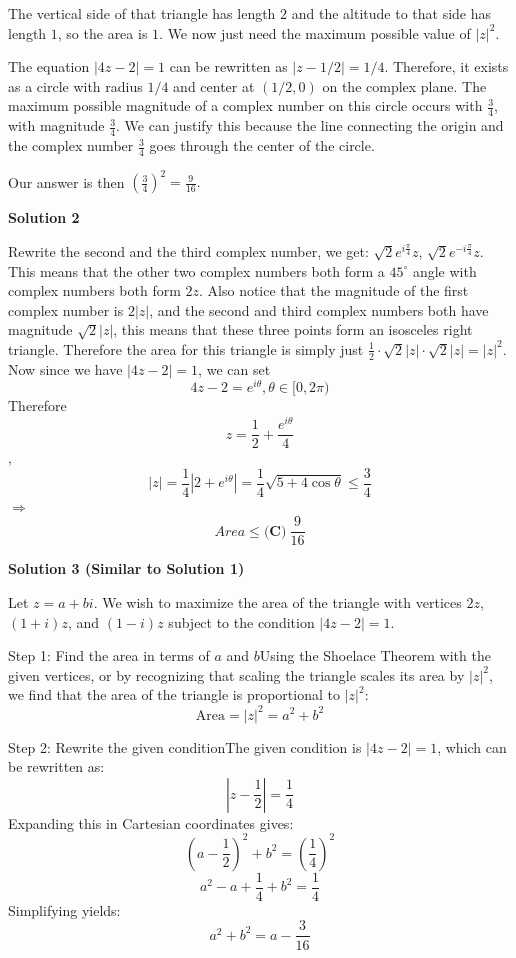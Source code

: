 \begin{enumerate}
 The vertical side of that triangle has length $2$ and the altitude to that side has length $1$, so the area is $1$. We now just need the maximum possible value of $|z|^2$.

 The equation $|4z-2| = 1$ can be rewritten as $|z-1/2| = 1/4$. Therefore, it exists as a circle with radius $1/4$ and center at $(1/2, 0)$ on the complex plane. The maximum possible magnitude of a complex number on this circle occurs with $\frac{3}{4}$, with magnitude $\frac{3}{4}$. We can justify this because the line connecting the origin and the complex number $\frac{3}{4}$ goes through the center of the circle.

 Our answer is then $\left(\frac{3}{4}\right)^2 = \boxed{\frac{9}{16}}.$




\textbf{Solution 2}

Rewrite the second and the third complex number, we get: $\sqrt{2}e^{i\frac{\pi}{4}}z$, $\sqrt{2}e^{-i\frac{\pi}{4}}z$. This means that the other two complex numbers both form a $45^{\circ}$ angle with complex numbers both form $2z$. Also notice that the magnitude of the first complex number is $2|z|$, and the second and third complex numbers both have magnitude $\sqrt{2}|z|$, this means that these three points form an isosceles right triangle. Therefore the area for this triangle is simply just $\frac{1}{2}\cdot\sqrt{2}|z|\cdot\sqrt{2}|z|=|z|^{2}$. Now since we have $|4z-2|=1$, we can set 
 \[4z-2=e^{i\theta},\theta\in[0,2\pi)\]Therefore
 \[z=\frac{1}{2}+\frac{e^{i\theta}}{4}\], 
 \[|z|=\frac{1}{4}|2+e^{i\theta}|=\frac{1}{4}\sqrt{5+4\cos\theta}\le\frac{3}{4}\]$\Rightarrow$ 
 \[Area\le \boxed{\textbf{(C)} \ \frac{9}{16}}\]




\textbf{Solution 3 (Similar to Solution 1)}

Let $z = a + bi$. We wish to maximize the area of the triangle with vertices $2z$, $(1+i)z$, and $(1-i)z$ subject to the condition $|4z - 2| = 1$.

 {Step 1: Find the area in terms of $a$ and $b$}Using the Shoelace Theorem with the given vertices, or by recognizing that scaling the triangle scales its area by $|z|^2$, we find that the area of the triangle is proportional to $|z|^2$:
 \[\text{Area} = |z|^2 = a^2 + b^2\]

 {Step 2: Rewrite the given condition}The given condition is $|4z - 2| = 1$, which can be rewritten as:
 \[\left|z - \frac{1}{2}\right| = \frac{1}{4}\]Expanding this in Cartesian coordinates gives:
 \[\left(a - \frac{1}{2}\right)^2 + b^2 = \left(\frac{1}{4}\right)^2\]
 \[a^2 - a + \frac{1}{4} + b^2 = \frac{1}{4}\]Simplifying yields:
 \[a^2 + b^2 = a - \frac{3}{16}\]


\end{enumerate}
